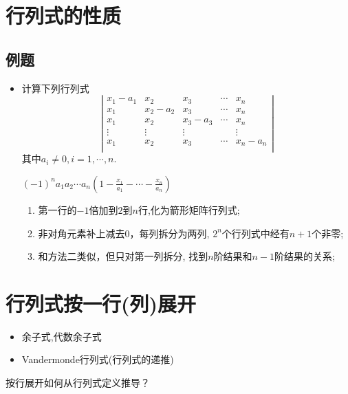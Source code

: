 \section{行列式的性质}
\subsection*{例题}
\begin{itemize}
    \item 计算下列行列式
    \begin{equation}
    \nonumber
    \left|
        \begin{array}{ccccc}
        x_1-a_1 &x_2     &x_3     &\cdots & x_n\\
        x_1     &x_2-a_2 &x_3     &\cdots & x_n\\
        x_1     &x_2     &x_3-a_3 &\cdots & x_n\\
        \vdots  &\vdots  &\vdots  &       & \vdots\\
        x_1     &x_2     &x_3     &\cdots & x_n-a_n\\
        \end{array}
    \right|
    \end{equation} 
    其中$a_i \ne 0, i = 1,\cdots,n.$
    \begin{solution}
		$(-1)^na_1 a_2 \cdots a_n \left(1-\frac{x_1}{a_1} - \cdots - \frac{x_n}{a_n}\right)$
		\begin{enumerate}
			\item 第一行的$-1$倍加到$2$到$n$行,化为箭形矩阵行列式;
			\item 非对角元素补上减去$0$，每列拆分为两列, $2^n$个行列式中经有$n+1$个非零;
			\item 和方法二类似，但只对第一列拆分, 找到$n$阶结果和$n-1$阶结果的关系;
		\end{enumerate}
	\end{solution}
    \vspace{2cm}
\end{itemize}

\section{行列式按一行(列)展开}
\begin{itemize}
    \item 余子式,代数余子式
    \item Vandermonde行列式(行列式的递推)
\end{itemize}

\vspace{1em}
\begin{remark}
	按行展开如何从行列式定义推导？
\end{remark}

